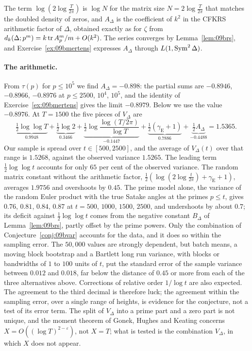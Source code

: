 The term $\log(2\log\frac T{2\pi})$ is $\log N$ for the matrix size $N=2\log\frac{T}{2\pi}$ that matches the doubled density of zeros, and $A_\Delta$ is the coefficient of $k^2$ in the CFKRS arithmetic factor of $\Delta$, obtained exactly as for $\zeta$ from $d_k(\Delta;p^m)=k\operatorname{tr} A_p^m/m+O(k^2)$. The series converges by Lemma~\ref{lem:09brs}, and Exercise~\ref{ex:09bmertens} expresses $A_\Delta$ through $L(1,\operatorname{Sym}^2\Delta)$.

\paragraph{The arithmetic.} From $\tau(p)$ for $p\le10^5$ we find $A_\Delta=-0.898$: the partial sums are $-0.8946$, $-0.8966$, $-0.8976$ at $p\le2500$, $10^4$, $10^5$, and the identity of Exercise~\ref{ex:09bmertens} gives the limit $-0.8979$. Below we use the value $-0.8976$. At $T=1500$ the five pieces of $V_\Delta$ are
\[
\underbrace{\tfrac12\log\log T}_{0.9948}+\underbrace{\tfrac12\log2}_{0.3466}+\underbrace{\tfrac12\log\frac{\log(T/2\pi)}{\log T}}_{-0.1447}+\underbrace{\tfrac12(\gamma_{\mathrm E}+1)}_{0.7886}+\underbrace{\tfrac12A_\Delta}_{-0.4488}=1.5365 .
\]
Our sample is spread over $t\in[500,2500]$, and the average of $V_\Delta(t)$ over that range is $1.5268$, against the observed variance $1.5265$. The leading term $\frac12\log\log t$ accounts for only $65$ per cent of the observed variance. The random matrix constant without the arithmetic factor, $\frac12(\log(2\log\frac{t}{2\pi})+\gamma_{\mathrm E}+1)$, averages $1.9756$ and overshoots by $0.45$. The prime model alone, the variance of the random Euler product with the true Satake angles at the primes $p\le t$, gives $0.76$, $0.81$, $0.84$, $0.87$ at $t=500$, $1000$, $1500$, $2500$, and undershoots by about $0.7$; its deficit against $\frac12\log\log t$ comes from the negative constant $B_\Delta$ of Lemma~\ref{lem:09brs}, partly offset by the prime powers. Only the combination of Conjecture~\ref{conj:09bvar} accounts for the data, and it does so within the sampling error. The $50{,}000$ values are strongly dependent, but batch means, a moving block bootstrap and a Bartlett long run variance, with blocks or bandwidths of $1$ to $100$ units of $t$, put the standard error of the sample variance between $0.012$ and $0.018$, far below the distance of $0.45$ or more from each of the three alternatives above. Corrections of relative order $1/\log t$ are also expected. The agreement to the third decimal is therefore luck; the agreement within the sampling error, over a single range of heights, is evidence for the conjecture, not a test of its error term. The split of $V_\Delta$ into a prime part and a zero part is not unique, and the moment theorem of Gonek, Hughes and Keating concerns $X=O((\log T)^{2-\varepsilon})$, not $X=T$; what is tested is the combination $V_\Delta$, in which $X$ does not appear.

